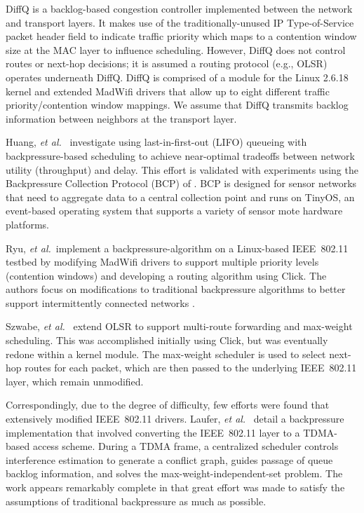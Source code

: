 \documentclass{article}
\newcommand{\etal}{\textit{et al.}}
\begin{document}
DiffQ \cite{WarJanHa2009} is a backlog-based congestion controller implemented between the network and transport layers.
It makes use of the traditionally-unused IP Type-of-Service packet header field to indicate traffic priority which maps to a contention window size at the MAC layer to influence scheduling.
However, DiffQ does not control routes or next-hop decisions; it is assumed a routing protocol (e.g., OLSR) operates underneath DiffQ.
DiffQ is comprised of a module for the Linux 2.6.18 kernel and extended MadWifi drivers that allow up to eight different traffic priority/contention window mappings.
We assume that DiffQ transmits backlog information between neighbors at the transport layer.


Huang, \etal\ \cite{HuaMoeNee2011} investigate using last-in-first-out (LIFO) queueing with backpressure-based scheduling to achieve near-optimal tradeoffs between network utility (throughput) and delay.
This effort is validated with experiments using the Backpressure Collection Protocol (BCP) of \cite{MoeSriKri2010}.
BCP is designed for sensor networks that need to aggregate data to a central collection point and runs on TinyOS, an event-based operating system that supports a variety of sensor mote hardware platforms.


Ryu, \etal\ implement a backpressure-algorithm on a Linux-based IEEE~802.11 testbed by modifying MadWifi drivers to support multiple priority levels (contention windows) and developing a routing algorithm using Click.
The authors focus on modifications to traditional backpressure algorithms to better support intermittently connected networks \cite{RyuBhaPai2010}.


Szwabe, \etal\ \cite{SzwLisNow2010} extend OLSR to support multi-route forwarding and max-weight scheduling.
This was accomplished initially using Click, but was eventually redone within a kernel module.
The max-weight scheduler is used to select next-hop routes for each packet, which are then passed to the underlying IEEE~802.11 layer, which remain unmodified.


Correspondingly, due to the degree of difficulty, few efforts were found that extensively modified IEEE~802.11 drivers.
Laufer, \etal\ \cite{LauSalLun2011} detail a backpressure implementation that involved converting the IEEE~802.11 layer to a TDMA-based access scheme.
During a TDMA frame, a centralized scheduler controls interference estimation to generate a conflict graph, guides passage of queue backlog information, and solves the max-weight-independent-set problem.
The work appears remarkably complete in that great effort was made to satisfy the assumptions of traditional backpressure as much as possible.
\end{document}
